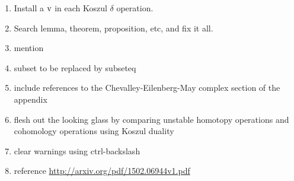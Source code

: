 \documentclass[11pt]{amsart} \renewcommand{\baselinestretch}{1.2}
\theoremstyle{plain}
\numberwithin{equation}{section} %
\theoremstyle{plain}
\numberwithin{equation}{chapter} %
\newcommand{\uver}{^\mathrm{v}}
\newcommand{\dver}{_\mathrm{v}}
\newcommand{\Sqv}{\mathrm{Sq}\dver}
\newcommand{\Sqvstar}[1]{\mathrm{Sq}\dver^{#1\star}}
\newcommand{\deltav}{\delta\uver}
\begin{document}
\begin{todolist}
\begin{enumerate}
\item Install a $\textup{v}$ in each Koszul $\delta$ operation.
\item Search lemma, theorem, proposition, etc, and fix it all.
\item mention %
\item subset to be replaced by subseteq
\item include references to the Chevalley-Eilenberg-May complex section of the appendix
\item flesh out the looking glass by comparing unstable homotopy operations and cohomology operations using Koszul duality
\item clear warnings using ctrl-backslash
\item reference \url{http://arxiv.org/pdf/1502.06944v1.pdf}

\end{enumerate}
\end{todolist}
\end{document}
